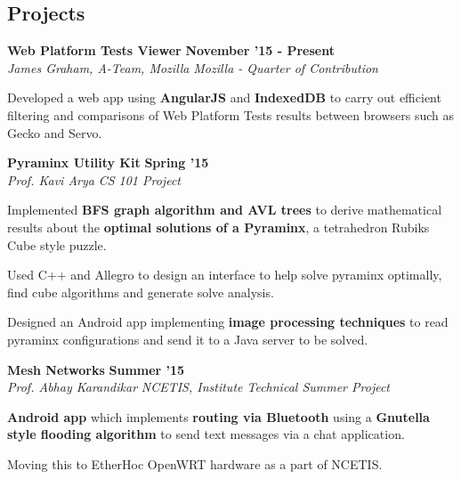 \documentclass[11pt]{resume}
\begin{document}
\begin{resume}
\vspace{-2.5mm}



\pagebreak
\vspace{-1em}
\section{\mysidestyle Projects}
\textbf{Web Platform Tests Viewer} \hfill \textbf{November '15 - Present}\\
\textsl{James Graham, A-Team, Mozilla} \hfill \textsl{Mozilla - Quarter of Contribution}\\
\vspace{-4mm}
\begin{list2}
\item Developed a web app using \textbf{AngularJS} and \textbf{IndexedDB} to carry out efficient filtering and comparisons of Web Platform Tests results between browsers such as Gecko and Servo.
\end{list2}
\textbf{Pyraminx Utility Kit} \hfill \textbf{Spring '15}\\
\textsl{Prof. Kavi Arya} \hfill \textsl{CS 101 Project}\\
\vspace{-4mm}
\begin{list2}
\item Implemented \textbf{BFS graph algorithm and AVL trees} to derive mathematical results about the \textbf{optimal solutions of a Pyraminx}, a tetrahedron Rubiks Cube style puzzle.
\item Used C++ and Allegro to design an interface to help solve pyraminx optimally, find cube algorithms and generate solve analysis.
\item Designed an Android app implementing \textbf{image processing techniques} to read pyraminx configurations and send it to a Java server to be solved.
\end{list2}

\textbf{Mesh Networks} \hfill \textbf{Summer '15}\\
\textsl{Prof. Abhay Karandikar} \hfill \textsl{NCETIS, Institute Technical Summer Project}\\
\vspace{-4mm}
\begin{list2}
\item  \textbf{Android app} which implements \textbf{routing via Bluetooth} using a \textbf{Gnutella style flooding algorithm} to send text messages via a chat application.
\item Moving this to EtherHoc OpenWRT hardware as a part of NCETIS.
\end{list2}



\end{resume}
\end{document}
